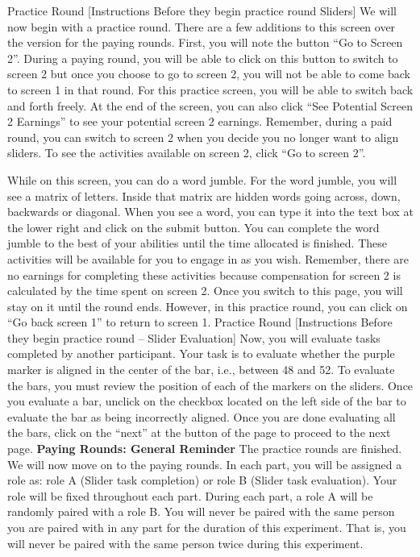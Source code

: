 Practice Round [Instructions Before they begin practice round Sliders]
We will now begin with a practice round. There are a few additions to this screen over the version for the paying rounds. First, you will note the button “Go to Screen 2”. During a paying round, you will be able to click on this button to switch to screen 2 but once you choose to go to screen 2, you will not be able to come back to screen 1 in that round. For this practice screen, you will be able to switch back and forth freely. At the end of the screen, you can also click “See Potential Screen 2 Earnings” to see your potential screen 2 earnings. Remember, during a paid round, you can switch to screen 2 when you decide you no longer want to align sliders. To see the activities available on screen 2, click “Go to screen 2”.

While on this screen, you can do a word jumble. For the word jumble, you will see a matrix of letters. Inside that matrix are hidden words going across, down, backwards or diagonal. When you see a word, you can type it into the text box at the lower right and click on the submit button. You can complete the word jumble to the best of your abilities until the time allocated is finished. These activities will be available for you to engage in as you wish. Remember, there are no earnings for completing these activities because compensation for screen 2 is calculated by the time spent on screen 2. Once you switch to this page, you will stay on it until the round ends. However, in this practice round, you can click on “Go back screen 1” to return to screen 1.
Practice Round [Instructions Before they begin practice round – Slider Evaluation]
Now, you will evaluate tasks completed by another participant. Your task is to evaluate whether the purple marker is aligned in the center of the bar, i.e., between 48 and 52. To evaluate the bars, you must review the position of each of the markers on the sliders. Once you evaluate a bar, unclick on the checkbox located on the left side of the bar to evaluate the bar as being incorrectly aligned.
Once you are done evaluating all the bars, click on the “next” at the button of the page to proceed to the next page.
\newline
\textbf{Paying Rounds: General Reminder}
\newline
The practice rounds are finished. We will now move on to the paying rounds. In each part, you will be assigned a role as: role A (Slider task completion) or role B (Slider task evaluation). Your role will be fixed throughout each part. During each part, a role A will be randomly paired with a role B. You will never be paired with the same person you are paired with in any part for the duration of this experiment. That is, you will never be paired with the same person twice during this experiment.


